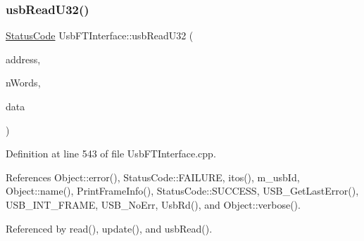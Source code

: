 \subsubsection{\texorpdfstring{usb\+Read\+U32()}{usbReadU32()}}
{\footnotesize\ttfamily \hyperlink{classStatusCode}{Status\+Code} Usb\+F\+T\+Interface\+::usb\+Read\+U32 (\begin{DoxyParamCaption}\item[{unsigned long int}]{address,  }\item[{unsigned long int}]{n\+Words,  }\item[{unsigned long $\ast$}]{data }\end{DoxyParamCaption})}



Definition at line 543 of file Usb\+F\+T\+Interface.\+cpp.



References Object\+::error(), Status\+Code\+::\+F\+A\+I\+L\+U\+RE, itos(), m\+\_\+usb\+Id, Object\+::name(), Print\+Frame\+Info(), Status\+Code\+::\+S\+U\+C\+C\+E\+SS, U\+S\+B\+\_\+\+Get\+Last\+Error(), U\+S\+B\+\_\+\+I\+N\+T\+\_\+\+F\+R\+A\+ME, U\+S\+B\+\_\+\+No\+Err, Usb\+Rd(), and Object\+::verbose().



Referenced by read(), update(), and usb\+Read().


